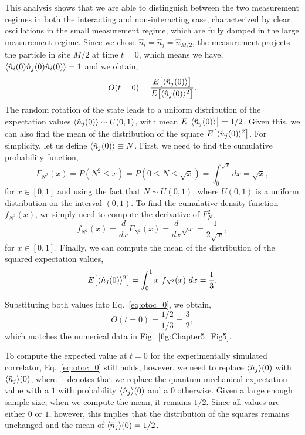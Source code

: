 This analysis shows that we are able to distinguish between the two measurement regimes in both the interacting and non-interacting case, characterized by clear oscillations in the small measurement regime, which are fully damped in the large measurement regime. Since we chose $\hat{n}_i = \hat{n}_j = \hat{n}_{M/2}$, the measurement projects the particle in site $M/2$ at time $t=0$, which means we have, $\langle\hat{n}_i(0) \hat{n}_j(0) \hat{n}_i(0)\rangle = 1$ and we obtain,
\begin{equation}
\label{eq:otoc_0}
    O(t=0) = \frac{ E\big[\langle\hat{n}_j(0)\rangle\big] }{ E\big[\langle\hat{n}_j(0)\rangle^2\big]}.    
\end{equation}
The random rotation of the state leads to a uniform distribution of the expectation values $\langle\hat{n}_j(0)\rangle \sim U(0,1)$, with mean $E\big[\langle\hat{n}_j(0)\rangle\big] = 1/2$. Given this, we can also find the mean of the distribution of the square $E\big[\langle\hat{n}_j(0)\rangle^2\big]$. For simplicity, let us define $\langle\hat{n}_j(0)\rangle \equiv N$. First, we need to find the cumulative probability function, 
\begin{equation}
    F_{N^2}(x) = P(N^2 \leq x) = P(0 \leq N \leq \sqrt{x}) = \int_0^{\sqrt{x}} dx = \sqrt{x},
\end{equation}
for $x\in[0,1]$ and using the fact that $N \sim U(0,1)$, where $U(0,1)$ is a uniform distribution on the interval $(0,1)$. To find the cumulative density function $f_{N^2}(x)$, we simply need to compute the derivative of $F_N^2$, 
\begin{equation}
    f_{N^2}(x) = \frac{d}{dx} F_{N^2}(x) = \frac{d}{dx} \sqrt{x} = \frac{1}{2\sqrt{x}},
\end{equation}
for $x\in[0,1]$. Finally, we can compute the mean of the distribution of the squared expectation values,
\begin{equation}
    E\big[\langle\hat{n}_j(0)\rangle^2\big] = \int_0^1 x~f_{N^2}(x)~dx = \frac{1}{3}. 
\end{equation}

Substituting both values into Eq.~\ref{eq:otoc_0}, we obtain,
\begin{equation}
    O(t=0) = \frac{1/2}{1/3} = \frac{3}{2},    
\end{equation}
which matches the numerical data in Fig.~\ref{fig:Chapter5_Fig5}.

To compute the expected value at $t=0$ for the experimentally simulated correlator, Eq.~\ref{eq:otoc_0} still holds, however, we need to replace $\langle\hat{n}_j\rangle(0)$ with $\langle\tilde{n}_j\rangle(0)$, where $\tilde{\cdot}$ denotes that we replace the quantum mechanical expectation value with a $1$ with probability $\langle\hat{n}_j\rangle(0)$ and a $0$ otherwise. Given a large enough sample size, when we compute the mean, it remains $1/2$. Since all values are either $0$ or $1$, however, this implies that the distribution of the squares remains unchanged and the mean of $\langle\tilde{n}_j\rangle(0) = 1/2$.

